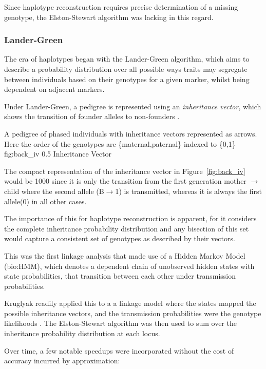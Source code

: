 Since haplotype reconstruction requires precise determination of a missing genotype, the Elston-Stewart algorithm was lacking in this regard.

\subsubsection{Lander-Green}

The era of haplotypes began with the Lander-Green algorithm, which aims to describe a probability distribution over all possible ways traits may segregate between individuals based on their genotypes for a given marker, whilst being dependent on adjacent markers.

Under Lander-Green, a pedigree is represented using an \textit{inheritance vector}, which shows the transition of founder alleles to non-founders \cite{landergreen}.

	{A pedigree of phased individuals with inheritance vectors represented as arrows. Here the order of the genotypes are \{maternal,paternal\} indexed to \{0,1\}}
	{fig:back_iv}
	{0.5}
	{Inheritance Vector}


The compact representation of the inheritance vector in Figure~\ref{fig:back_iv} would be 1000 since it is only the transition from the first generation mother \(\rightarrow\) child where the second allele (B\(\rightarrow\)1) is transmitted, whereas it is always the first allele(0) in all other cases.

The importance of this for haplotype reconstruction is apparent, for it considers the complete inheritance probability distribution and any bisection of this set would capture a consistent set of genotypes as described by their vectors.

This was the first linkage analysis that made use of a Hidden Markov Model (\gls{bio:HMM}),  which denotes a dependent chain of unobserved hidden states with state probabilities, that transition between each other under transmission probabilities.  

Kruglyak readily applied this to a a linkage model where the states mapped the possible inheritance vectors, and the transmission probabilities were the genotype likelihoods \cite{kruglyak_parametric_1996}. The Elston-Stewart algorithm was then used to sum over the inheritance probability distribution at each locus.

Over time, a few notable speedups were incorporated without the cost of accuracy incurred by approximation:

